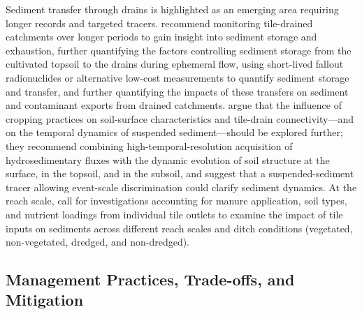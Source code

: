 \documentclass[11pt]{article}
\begin{document}
Sediment transfer through drains is highlighted as an emerging area requiring longer records and targeted tracers. \textcite{Grangeon2021} recommend monitoring tile-drained catchments over longer periods to gain insight into sediment storage and exhaustion, further quantifying the factors controlling sediment storage from the cultivated topsoil to the drains during ephemeral flow, using short-lived fallout radionuclides or alternative low-cost measurements to quantify sediment storage and transfer, and further quantifying the impacts of these transfers on sediment and contaminant exports from drained catchments. \textcite{Gaillot2023b} argue that the influence of cropping practices on soil-surface characteristics and tile-drain connectivity---and on the temporal dynamics of suspended sediment---should be explored further; they recommend combining high-temporal-resolution acquisition of hydrosedimentary fluxes with the dynamic evolution of soil structure at the surface, in the topsoil, and in the subsoil, and suggest that a suspended-sediment tracer allowing event-scale discrimination could clarify sediment dynamics. At the reach scale, \textcite{Ahiablame2010} call for investigations accounting for manure application, soil types, and nutrient loadings from individual tile outlets to examine the impact of tile inputs on sediments across different reach scales and ditch conditions (vegetated, non-vegetated, dredged, and non-dredged).

\subsection{Management Practices, Trade-offs, and Mitigation}
\end{document}
